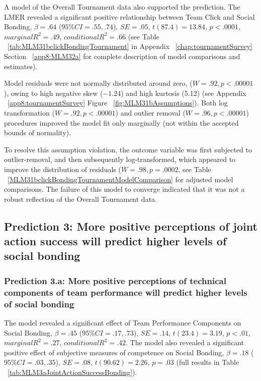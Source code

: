 \begin{CJK}{UTF8}{gbsn}
A model of the Overall Tournament data also supported the prediction. The LMER revealed a significant positive relationship between  Team Click and Social Bonding, $\beta = .64$ ($95\% CI = .55, .74$), $SE = .05$, $t(87.4) = 13.84$, $p < .0001$, $marginal R^2 = .49$, $conditional R^2 = .66$ (see Table ~\ref{tab:MLM31bclickBondingTournament} in Appendix ~\ref{chap:tournamentSurvey} Section ~\ref{app8:MLM32a} for complete description of model comparisons and estimates).

Model residuals were not normally distributed around zero, ($W = .92, p < .00001$), owing to high negative skew ($-1.24$) and high kurtosis (5.12) (see Appendix ~\ref{app8:tournamentSurvey} Figure ~\ref{fig:MLM31bAssumptions}). Both log transformation ($W = .92, p < .00001$) and outlier removal ($W = .96, p < .00001$) procedures improved the model fit only marginally (not within the accepted bounds of normality).

To resolve this assumption violation, the outcome variable was first subjected to outlier-removal, and then subsequently log-transformed, which appeared to improve the distribution of residuals ($W = .98, p = .0002$, see Table ~\ref{MLM31bclickBondingTournamentModelComparison} for adjusted model comparisons.  The failure of this model to converge indicated that it was not a robust reflection of the Overall Tournament data.











\subsection{Prediction 3: More positive perceptions of joint action success will predict higher levels of social bonding}



\subsubsection{Prediction 3.a: More positive perceptions of technical components of team performance will predict higher levels of social bonding }


The model revealed a significant effect of Team Performance Components on Social Bonding, $\beta = .45$ ($95\% CI =  .17, .73$), $SE = .14$, $t(23.4) = 3.19$, $p < .01$, $marginal R^2 = .27$, $conditional R^2 = .42$.  The model also revealed a significant positive effect of subjective measures of competence on Social Bonding, $\beta = .18$ ($95\% CI =  .03, .35$), $SE = .08$, $t(90.62) = 2.26$, $p = .03$ (full results in Table ~\ref{tab:MLM3aJointActionSuccessBonding}).


\end{CJK}
